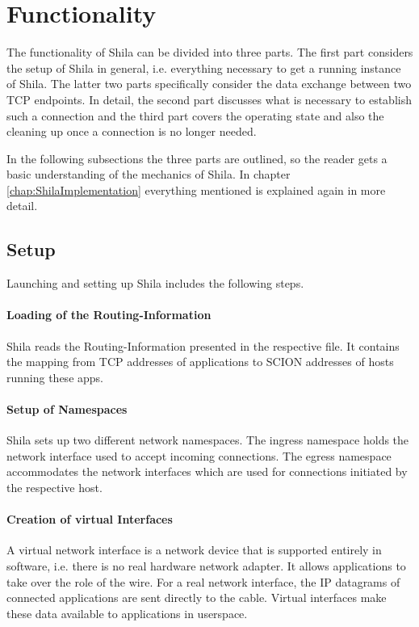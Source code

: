 \newpage
\section{Functionality}
\label{sec:ShilaFunctionality}

The functionality of Shila can be divided into three parts. The first part considers the setup of Shila in general, i.e. everything necessary to get a running instance of Shila. The latter two parts specifically consider the data exchange between two TCP endpoints. In detail, the second part discusses what is necessary to establish such a connection and the third part covers the operating state and also the cleaning up once a connection is no longer needed. 

In the following subsections the three parts are outlined, so the reader gets a basic understanding of the mechanics of Shila. In chapter \ref{chap:ShilaImplementation} everything mentioned is explained again in more detail.

\subsection*{Setup}

Launching and setting up Shila includes the following steps.

\paragraph{Loading of the Routing-Information} Shila reads the Routing-Information presented in the respective file. It contains the mapping from TCP addresses of applications to SCION addresses of hosts running these apps. 

\paragraph{Setup of Namespaces} Shila sets up two different network namespaces. The ingress namespace holds the network interface used to accept incoming connections. The egress namespace accommodates the network interfaces which are used for connections initiated by the respective host.

\paragraph{Creation of virtual Interfaces} A virtual network interface is a network device that is supported entirely in software, i.e. there is no real hardware network adapter. It allows applications to take over the role of the wire. For a real network interface, the IP datagrams of connected applications are sent directly to the cable. Virtual interfaces make these data available to applications in userspace.


